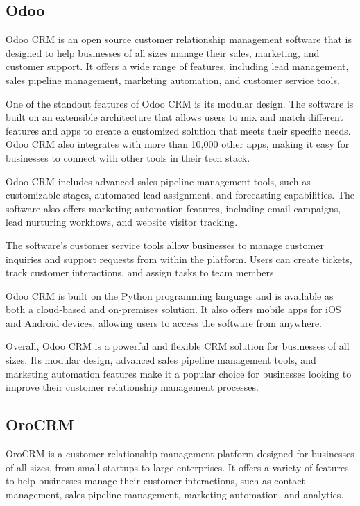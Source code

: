 \documentclass{article}
\begin{document}
\subsection{Odoo}

Odoo CRM is an open source customer relationship management software that is designed to help businesses of all sizes manage their sales, marketing, and customer support. It offers a wide range of features, including lead management, sales pipeline management, marketing automation, and customer service tools.

One of the standout features of Odoo CRM is its modular design. The software is built on an extensible architecture that allows users to mix and match different features and apps to create a customized solution that meets their specific needs. Odoo CRM also integrates with more than 10,000 other apps, making it easy for businesses to connect with other tools in their tech stack.

Odoo CRM includes advanced sales pipeline management tools, such as customizable stages, automated lead assignment, and forecasting capabilities. The software also offers marketing automation features, including email campaigns, lead nurturing workflows, and website visitor tracking.

The software's customer service tools allow businesses to manage customer inquiries and support requests from within the platform. Users can create tickets, track customer interactions, and assign tasks to team members.

Odoo CRM is built on the Python programming language and is available as both a cloud-based and on-premises solution. It also offers mobile apps for iOS and Android devices, allowing users to access the software from anywhere.

Overall, Odoo CRM is a powerful and flexible CRM solution for businesses of all sizes. Its modular design, advanced sales pipeline management tools, and marketing automation features make it a popular choice for businesses looking to improve their customer relationship management processes.

\subsection{OroCRM}

OroCRM is a customer relationship management platform designed for businesses of all sizes, from small startups to large enterprises. It offers a variety of features to help businesses manage their customer interactions, such as contact management, sales pipeline management, marketing automation, and analytics.
\end{document}
